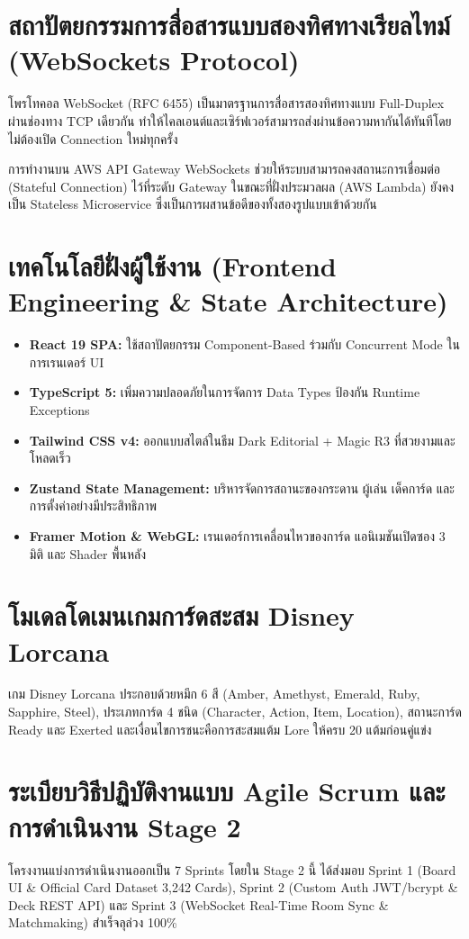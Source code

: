 \documentclass[12pt,a4paper]{report}
\begin{document}
\section{สถาปัตยกรรมการสื่อสารแบบสองทิศทางเรียลไทม์ (WebSockets Protocol)}
โพรโทคอล WebSocket (RFC 6455) เป็นมาตรฐานการสื่อสารสองทิศทางแบบ Full-Duplex ผ่านช่องทาง TCP เดียวกัน ทำให้ไคลเอนต์และเซิร์ฟเวอร์สามารถส่งผ่านข้อความหากันได้ทันทีโดยไม่ต้องเปิด Connection ใหม่ทุกครั้ง 

การทำงานบน AWS API Gateway WebSockets ช่วยให้ระบบสามารถคงสถานะการเชื่อมต่อ (Stateful Connection) ไว้ที่ระดับ Gateway ในขณะที่ฝั่งประมวลผล (AWS Lambda) ยังคงเป็น Stateless Microservice ซึ่งเป็นการผสานข้อดีของทั้งสองรูปแบบเข้าด้วยกัน

\section{เทคโนโลยีฝั่งผู้ใช้งาน (Frontend Engineering \& State Architecture)}
\begin{itemize}
    \item \textbf{React 19 SPA:} ใช้สถาปัตยกรรม Component-Based ร่วมกับ Concurrent Mode ในการเรนเดอร์ UI
    \item \textbf{TypeScript 5:} เพิ่มความปลอดภัยในการจัดการ Data Types ป้องกัน Runtime Exceptions
    \item \textbf{Tailwind CSS v4:} ออกแบบสไตล์ในธีม Dark Editorial + Magic R3 ที่สวยงามและโหลดเร็ว
    \item \textbf{Zustand State Management:} บริหารจัดการสถานะของกระดาน ผู้เล่น เด็คการ์ด และการตั้งค่าอย่างมีประสิทธิภาพ
    \item \textbf{Framer Motion \& WebGL:} เรนเดอร์การเคลื่อนไหวของการ์ด แอนิเมชันเปิดซอง 3 มิติ และ Shader พื้นหลัง
\end{itemize}

\section{โมเดลโดเมนเกมการ์ดสะสม Disney Lorcana}
เกม Disney Lorcana ประกอบด้วยหมึก 6 สี (Amber, Amethyst, Emerald, Ruby, Sapphire, Steel), ประเภทการ์ด 4 ชนิด (Character, Action, Item, Location), สถานะการ์ด Ready และ Exerted และเงื่อนไขการชนะคือการสะสมแต้ม Lore ให้ครบ 20 แต้มก่อนคู่แข่ง

\section{ระเบียบวิธีปฏิบัติงานแบบ Agile Scrum และการดำเนินงาน Stage 2}
โครงงานแบ่งการดำเนินงานออกเป็น 7 Sprints โดยใน Stage 2 นี้ ได้ส่งมอบ Sprint 1 (Board UI \& Official Card Dataset 3,242 Cards), Sprint 2 (Custom Auth JWT/bcrypt \& Deck REST API) และ Sprint 3 (WebSocket Real-Time Room Sync \& Matchmaking) สำเร็จลุล่วง 100\%
\end{document}
